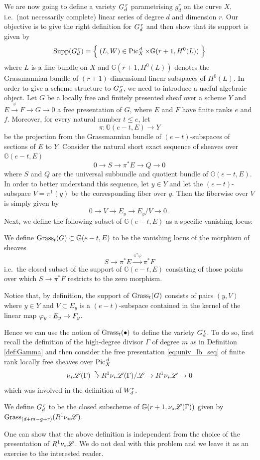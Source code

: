 	We are now going to define a variety $G_d^{\,r}$ parametrising $g_d^r$ on the curve $X$, i.e.\ (not necessarily complete) linear series of degree $d$ and dimension $r$. Our objective is to give the right definition for $G_d^{\,r}$ and then show that its support is given by
	$$ \operatorname{Supp}(G_d^{\,r}) = \left\{\;  (L,W) \in \operatorname{Pic}^{\,d}_X \times \mathbb{G}(r+1, H^0(L))  \; \right\} $$
	where $L$ is a line bundle on $X$ and $\mathbb{G}(r+1, H^0(L))$ denotes the Grassmannian bundle of $(r+1)$-dimensional linear subspaces of $H^0(L)$.
	In order to give a scheme structure to $G_d^{\,r}$, we need to introduce a useful algebraic object. Let $G$ be a locally free and finitely presented sheaf over a scheme $Y$ and $ E\overset{\varphi}\to F \to G \to 0$ a free presentation of $G$, where $E$ and $F$ have finite ranks $e$ and $f$. Moreover, for every natural number $t\leq e$, let
	$$ \pi:\mathbb{G}(e-t, E)\to Y $$ 
	be the projection from the Grassmannian bundle of $(e-t)$-subspaces of sections of $E$ to $Y$.
	Consider the natural short exact sequence of sheaves over $\mathbb{G}(e-t, E)$
	$$ 0\to S \to \pi^* E \to Q \to 0 $$
	where $S$ and $Q$ are the universal subbundle and quotient bundle of $\mathbb{G}(e-t, E)$. 
	In order to better understand this sequence, let $y\in Y$ and let the $(e-t)$-subspace $V=\pi^{1}(y)$ be the corresponding fiber over $y$. Then the fiberwise \ses over $V$ is simply given by
	$$ 0\to V \to E_y \to E_y/V \to 0 \,. $$
	Next, we define the following subset of $\mathbb{G}(e-t, E)$ as a specific vanishing locus:
	\begin{defi}
		We define $\operatorname{Grass}_t(G) \subset \mathbb{G}(e-t, E)$ to be the vanishing locus of the morphism of sheaves
		$$ S\longrightarrow \pi^*E \overset{\pi^*\varphi} \longrightarrow \pi^* F $$
		i.e.\ the closed subset of the support of $\mathbb{G}(e-t, E)$ consisting of those points over which $S\to \pi^* F$ restricts to the zero morphism.
	\end{defi}
	\begin{rema}\label{rema:ker}
		Notice that, by definition, the support of $\operatorname{Grass}_t(G)$ consists of pairs $(y, V)$ where $y\in Y$ and $V\subset E_y$ is a $(e-t)$-subspace contained in the kernel of the linear map $\varphi_y: E_y \to F_y$.
	\end{rema}
	Hence we can use the notion of $\operatorname{Grass}_t(\bullet)$ to define the variety $G_d^{\,r}$. To do so, first recall the definition of the high-degree divisor $\Gamma$ of degree $m$ as in Definition \ref{def:Gamma} and then consider the free presentation \eqref{eq:univ_lb_seq} of finite rank locally free sheaves over $\operatorname{Pic}^{\,d}_X$
	$$ \nu_{*} \mathscr{L}(\Gamma)\overset{\gamma}\to R^1 \nu_{*} \mathscr{L}(\Gamma) / \mathscr{L} \to R^1 \nu_{*} \mathscr{L} \to 0 $$
	which was involved in the definition of $W_d^r$.
	\begin{defi}
		We define $G_d^{\,r}$ to be the closed subscheme of $\mathbb{G}(r+1, \nu_{*} \mathscr{L}(\Gamma))$ given by $\operatorname{Grass}_{(d+m-g+r)}(R^1 \nu_{*} \mathscr{L})$.
	\end{defi}
	One can show that the above definition is independent from the choice of the presentation of $R^1 \nu_{*} \mathscr{L}$. We do not deal with this problem and we leave it as an exercise to the interested reader.\\

